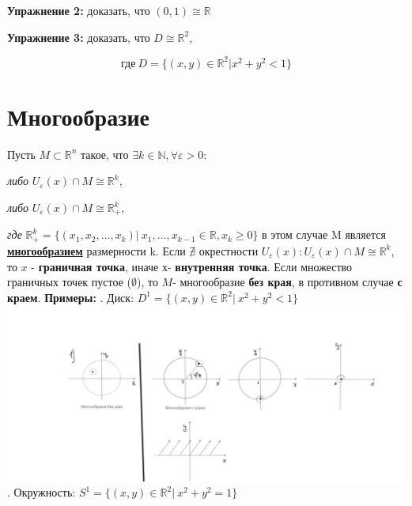 \documentclass[12pt,a4paper]{article}
\begin{document}
	\textbf{\large{Упражнение 2:}} доказать, что $(0,1) \cong  \mathbb{R}$
	
	\textbf{\large{Упражнение 3:}} доказать, что $D\cong \mathbb{R}^2$,
	
	\[ \textit{где}~ D =\{(x,y)\in \mathbb{R}^2 | x^2 + y^2 < 1\} \]
	
	\newpage
\section*{Многообразие}

Пусть \(M \subset \mathbb{R}^n\) такое, что $\exists k\in \mathbb{N}, \forall \varepsilon >0$:
\begin{center}
 \textit{либо} \(U_{\varepsilon} (x)\cap M \cong \mathbb{R}^k\),
\end{center}
\begin{center}
 \textit{либо} \(U_{\varepsilon} (x)\cap M \cong \mathbb{R}_{+}^k\),
\end{center}
\textit{где} \(\mathbb{R}_{+}^k = \{(x_1,x_2,...,x_k)|~ x_1,..., x_{k-1} \in \mathbb{R}, x_k\ge 0\}\)
\newline в этом случае M является \underline{\textbf{многообразием}} размерности k.
\newline Если $\nexists$ окрестности $U_{\varepsilon} (x): U_{\varepsilon} (x)\cap M \cong \mathbb{R}^k$, то $x$ - \textbf{граничная точка}, иначе \(х\)- \textbf{внутренняя точка}.
\newline Если множество граничных точек пустое (\(\emptyset\)), то $M$- многообразие \textbf{без края}, в противном случае \textbf{с краем}.
\newline \textbf{Примеры:}
. Диск: $D^1 = \{(x,y) \in \mathbb{R}^2 |~ x^2 + y^2 < 1 \} $
\newline \includegraphics[scale=1]{images/Section 2. Manifold/image1}
. Окружность: \(S^1 = \{(x,y)\in \mathbb{R}^2|~ x^2 + y^2 =1\}\) 
\end{document}
